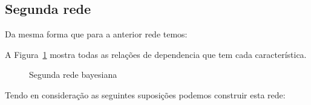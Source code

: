 \subsection{Segunda rede}
	Da mesma forma que para a anterior rede temos:
	\begin{comment}
	\begin{itemize}
		\item age: marital-status
		\item marital-status: workclass
		\item workclass: relationship,hours-per-week
		\item hours-per-week: capital-gain,capital-loss
		\item native-country: occupation,education,education-num,race
		\item race: education
		\item sex: workclass
		\item relationship: capital-gain,capital-loss
		\item occupation: capital-gain,capital-loss
		\item education-num: education
		\item education: marital-status
		\item capital-gain: annual-income
		\item capital-loss: annual-income
		\item annual-income:
	\end{itemize}
	\end{comment}
	A Figura~\ref{fig:rede2} mostra todas as relações de dependencia que tem cada característica.
	\begin{figure}[H]
		\centering
		
		\caption{Segunda rede bayesiana}
		\label{fig:rede2}
	\end{figure}
	Tendo en consideração as seguintes suposições podemos construir esta rede:
